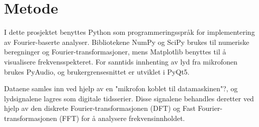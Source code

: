 \section{Metode}
I dette prosjektet benyttes Python som programmeringsspråk for implementering av Fourier-baserte analyser. Bibliotekene NumPy og SciPy brukes til numeriske beregninger og Fourier-transformasjoner, mens Matplotlib benyttes til å visualisere frekvensspekteret. For sanntids innhenting av lyd fra mikrofonen brukes PyAudio, og brukergrensesnittet er utviklet i PyQt5. 

Dataene samles inn ved hjelp av en "mikrofon koblet til datamaskinen"?, og lydsignalene lagres som digitale tidsserier. Disse signalene behandles deretter ved hjelp av den diskrete Fourier-transformasjonen (DFT) og Fast Fourier-transformasjonen (FFT) for å analysere frekvensinnholdet.
